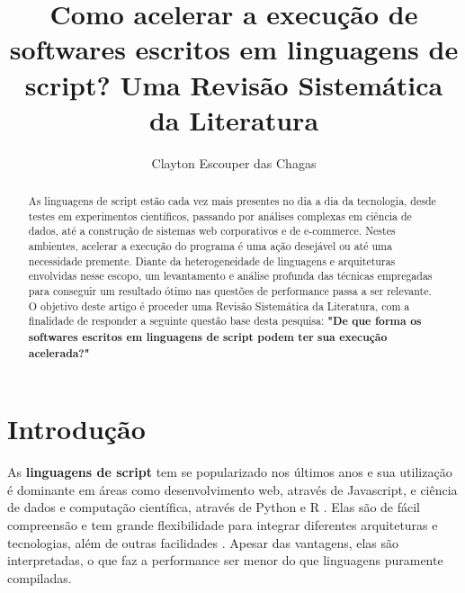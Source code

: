 \documentclass[sigconf]{acmart}
\begin{document}
\title{Como acelerar a execução de softwares escritos em linguagens de script? Uma Revisão Sistemática da Literatura}

\author{Clayton Escouper das Chagas}

\renewcommand{\shortauthors}{Clayton Escouper das Chagas}

\begin{abstract}
As linguagens de script estão cada vez mais presentes no dia a dia da tecnologia, desde testes em experimentos científicos, passando por análises complexas em ciência de dados, até a construção de sistemas web corporativos e de e-commerce. Nestes ambientes, acelerar a execução do programa é uma ação desejável ou até uma necessidade premente. Diante da heterogeneidade de linguagens e arquiteturas envolvidas nesse escopo, um levantamento e análise profunda das técnicas empregadas para conseguir um resultado ótimo nas questões de performance passa a ser relevante. O objetivo deste artigo é proceder uma Revisão Sistemática da Literatura, com a finalidade de responder a seguinte questão base desta pesquisa: \textbf{"De que forma os softwares escritos em linguagens de script podem ter sua execução acelerada?"}
\end{abstract}


\maketitle

\section{Introdução}
As \textbf{linguagens de script} tem se popularizado nos últimos anos e sua utilização é dominante em áreas como desenvolvimento web, através de Javascript, e ciência de dados e computação científica, através de Python e R \cite{IEEESpectrum:2020}\cite{GitHubOctoverse:2020}\cite{StackOverflow:2020}\cite{TIOBEIndex:2020}\cite{PYPL:2020}. Elas são de fácil compreensão e tem grande flexibilidade para integrar diferentes arquiteturas e tecnologias, além de outras facilidades \cite{ousterhout1998scripting}. Apesar das vantagens, elas são interpretadas, o que faz a performance ser menor do que linguagens puramente compiladas.
\end{document}
